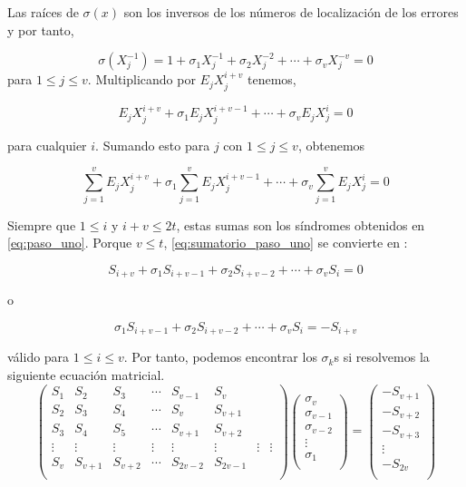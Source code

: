 Las raíces de $\sigma(x)$ son los inversos de los números de localización de los errores y por tanto, 

\[ 
\sigma(X_j^{-1}) = 1 + \sigma_1X_j^{-1} + \sigma_2X_j^{-2} + \cdots + 	\sigma_vX_j^{-v} = 0
\]
 para $ 1 \leq j \leq v$. Multiplicando por $E_jX_j^{i+v}$ tenemos,
 
 \[ 
 E_jX_j^{i+v} + \sigma_1E_jX_j^{i+v-1} + \cdots + \sigma_vE_jX_j^{i} = 0
 \]

para cualquier $i$. Sumando esto para $j$ con $1 \leq j \leq v$, obtenemos 

\begin{equation}
\label{eq:sumatorio_paso_uno}
 \sum_{j=1}^v E_jX_j^{i+v} + \sigma_1\sum_{j=1}^v E_jX_j^{i+v-1} + \cdots + \sigma_v\sum_{j=1}^v E_jX_j^{i} = 0
\end{equation}

Siempre que $ 1 \leq i$ y $i+v \leq 2t$, estas sumas son los síndromes obtenidos en \ref{eq:paso_uno}. Porque $ v \leq t$, \ref{eq:sumatorio_paso_uno} se convierte en :

\[ 
S_{i+v} + \sigma_1S_{i+v-1} + \sigma_2S_{i+v-2} + \cdots + \sigma_vS_i = 0
\]

o 

\begin{equation}
\label{eq:sindromes_paso_uno}
 \sigma_1S_{i+v-1} + \sigma_2S_{i+v-2} + \cdots + \sigma_vS_i = - S_{i+v} 
\end{equation}

válido para $ 1 \leq i \leq v$. Por tanto, podemos encontrar los $\sigma_k$s si resolvemos la siguiente ecuación matricial.
\begin{equation}
\label{eq:sistema_matricial}
\begin{pmatrix}
			S_1 & S_2 & S_3 & \cdots & S_{v-1} & S_v \\
			S_2 & S_3 & S_4 & \cdots  & S_v & S_{v+1} \\
			S_3 & S_4 & S_5 & \cdots & S_{v+1} & S_{v+2} \\ 
 			\vdots & \vdots & \vdots & \vdots & \vdots &\vdots & \vdots & \vdots \\
			S_v & S_{v+1} & S_{v+2} & \cdots  & S_{2v-2} & S_{2v-1} \\
	\end{pmatrix}
	\begin{pmatrix}
			\sigma_v \\
			\sigma_{v-1} \\
			\sigma_{v-2}  \\ 
 			\vdots \\
			\sigma_1  \\
	\end{pmatrix} = \begin{pmatrix}
			-S_{v+1} \\
			-S_{v+2} \\
			-S_{v+3}  \\ 
 			\vdots \\
			-S_{2v}  \\
	\end{pmatrix}
\end{equation}

